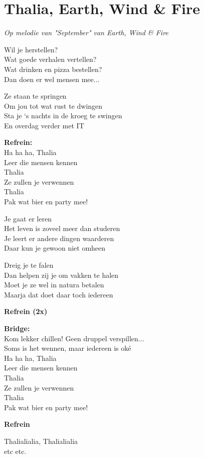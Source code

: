 \section{Thalia, Earth, Wind \& Fire}
\textit{Op melodie van "September" van Earth, Wind \& Fire}

Wil je herstellen?\\
Wat goede verhalen vertellen?\\
Wat drinken en pizza bestellen?\\
Dan doen er wel mensen mee...

Ze staan te springen\\
Om jou tot wat rust te dwingen\\
Sta je ‘s nachts in de kroeg te swingen\\
En overdag verder met IT

\textbf{Refrein:}\\
Ha ha ha, Thalia\\
Leer die mensen kennen\\
Thalia\\
Ze zullen je verwennen\\
Thalia\\
Pak wat bier en party mee!

Je gaat er leren\\
Het leven is zoveel meer dan studeren\\
Je leert er andere dingen waarderen\\
Daar kun je gewoon niet omheen

Dreig je te falen\\
Dan helpen zij je om vakken te halen\\
Moet je ze wel in natura betalen\\
Maarja dat doet daar toch iedereen

\textbf{Refrein (2x)}

\textbf{Bridge:}\\
Kom lekker chillen! Geen druppel verspillen...\\
Soms is het wennen, maar iedereen is oké\\
Ha ha ha, Thalia\\
Leer die mensen kennen\\
Thalia\\
Ze zullen je verwennen\\
Thalia\\
Pak wat bier en party mee!

\textbf{Refrein}

Thalialialia, Thalialialia\\
etc etc.
